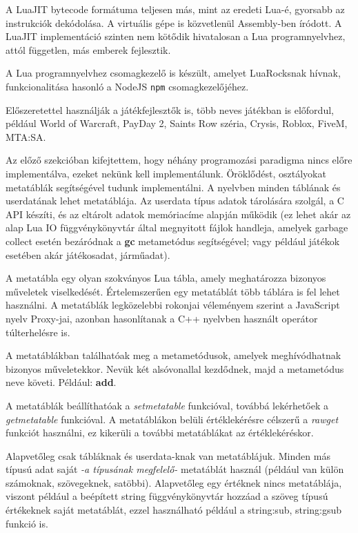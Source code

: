 A LuaJIT bytecode formátuma teljesen más, mint az eredeti Lua-é, gyorsabb az instrukciók dekódolása. A virtuális gépe is közvetlenül Assembly-ben íródott. A LuaJIT implementáció szinten nem kötődik hivatalosan a Lua programnyelvhez, attól független, más emberek fejlesztik. \cite {luajit}

A Lua programnyelvhez csomagkezelő is készült, amelyet LuaRocksnak hívnak, funkcionalitása hasonló a NodeJS \texttt{npm} csomagkezelőjéhez.

Előszeretettel használják a játékfejlesztők is, több neves játékban is előfordul, például World of Warcraft, PayDay 2, Saints Row széria, Crysis, Roblox, FiveM, MTA:SA. \cite{usageoflua}

\pagebreak

\label{sect:metatables}
Az előző szekcióban kifejtettem, hogy néhány programozási paradigma nincs előre implementálva, ezeket nekünk kell implementálunk. Öröklődést, osztályokat metatáblák segítségével tudunk implementálni.
A nyelvben minden táblának és userdatának lehet metatáblája. Az userdata típus adatok tárolására szolgál, a C API készíti, és az eltárolt adatok memóriacíme alapján működik (ez lehet akár az alap Lua IO függvénykönyvtár által megnyitott fájlok handleja, amelyek garbage collect esetén bezáródnak a \detokenize{__}\textbf{gc} metametódus segítségével; vagy például játékok esetében akár játékosadat, járműadat).

A metatábla egy olyan szokványos Lua tábla, amely meghatározza bizonyos műveletek viselkedését. Értelemszerűen egy metatáblát több táblára is fel lehet használni. A metatáblák legközelebbi rokonjai véleményem szerint a JavaScript nyelv Proxy-jai, azonban hasonlítanak a C++ nyelvben használt operátor túlterhelésre is. 

A metatáblákban találhatóak meg a metametódusok, amelyek meghívódhatnak bizonyos műveletekkor. Nevük két alsóvonallal kezdődnek, majd a metametódus neve követi. Például: \detokenize{__}\textbf{add}.

A metatáblák beállíthatóak a \textit{setmetatable} funkcióval, továbbá lekérhetőek a \textit{getmetatable} funkcióval. A metatáblákon belüli értéklekérésre célszerű a \textit{rawget} funkciót használni, ez kikerüli a további metatáblákat az értéklekéréskor.

Alapvetőleg csak tábláknak és userdata-knak van metatáblájuk. Minden más típusú adat saját \textit{-a típusának megfelelő-} metatáblát használ (például van külön számoknak, szövegeknek, satöbbi). Alapvetőleg egy értéknek nincs metatáblája, viszont például a beépített string függvénykönyvtár hozzáad a szöveg típusú értékeknek saját metatáblát, ezzel használható például a string:sub, string:gsub funkció is.

